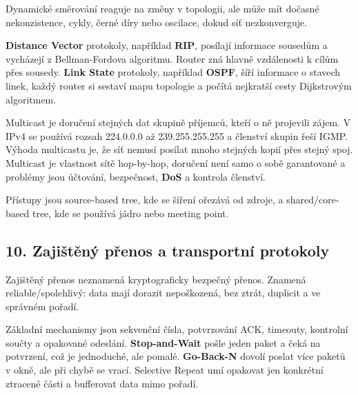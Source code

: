 \documentclass[11pt,a4paper]{article}
\begin{document}
Dynamické směrování reaguje na změny v topologii, ale může mít dočasné nekonzistence, cykly, černé díry nebo oscilace, dokud síť nezkonverguje.

\textbf{Distance Vector} protokoly, například \textbf{RIP}, posílají informace sousedům a vycházejí z Bellman-Fordova algoritmu. Router zná hlavně vzdálenosti k cílům přes sousedy. \textbf{Link State} protokoly, například \textbf{OSPF}, šíří informace o stavech linek, každý router si sestaví mapu topologie a počítá nejkratší cesty Dijkstrovým algoritmem.

Multicast je doručení stejných dat skupině příjemců, kteří o ně projevili zájem. V IPv4 se používá rozsah 224.0.0.0 až 239.255.255.255 a členství skupin řeší IGMP. Výhoda multicastu je, že síť nemusí posílat mnoho stejných kopií přes stejný spoj. Multicast je vlastnost sítě hop-by-hop, doručení není samo o sobě garantované a problémy jsou účtování, bezpečnost, \textbf{DoS} a kontrola členství.

Přístupy jsou source-based tree, kde se šíření ořezává od zdroje, a shared/core-based tree, kde se používá jádro nebo meeting point.

\subsection*{10. Zajištěný přenos a transportní protokoly}

Zajištěný přenos neznamená kryptograficky bezpečný přenos. Znamená reliable/spolehlivý: data mají dorazit nepoškozená, bez ztrát, duplicit a ve správném pořadí.

Základní mechanismy jsou sekvenční čísla, potvrzování ACK, timeouty, kontrolní součty a opakované odeslání. \textbf{Stop-and-Wait} pošle jeden paket a čeká na potvrzení, což je jednoduché, ale pomalé. \textbf{Go-Back-N} dovolí poslat více paketů v okně, ale při chybě se vrací. Selective Repeat umí opakovat jen konkrétní ztracené části a bufferovat data mimo pořadí.
\end{document}
